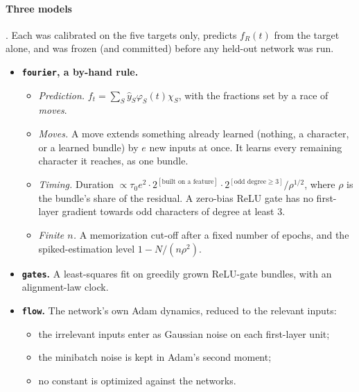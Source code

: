 \paragraph{Three models} . Each was calibrated on the five targets only, predicts $f_R(t)$ from the target alone, and was frozen (and committed) before any held-out network was run.
\begin{itemize}
\item \textbf{\texttt{fourier}, a by-hand rule.}
  \begin{itemize}
  \item \emph{Prediction.} $f_t=\sum_S\hat y_S\varphi_S(t)\chi_S$, with the fractions set by a race of \emph{moves}.
  \item \emph{Moves.} A move extends something already learned (nothing, a character, or a learned bundle) by $e$ new inputs at once. It learns every remaining character it reaches, as one bundle.
  \item \emph{Timing.} Duration $\propto\tau_0e^2\cdot2^{[\text{built on a feature}]}\cdot2^{[\text{odd degree}\ge3]}/\rho^{1/2}$, where $\rho$ is the bundle's share of the residual. A zero-bias ReLU gate has no first-layer gradient towards odd characters of degree at least 3.
  \item \emph{Finite $n$.} A memorization cut-off after a fixed number of epochs, and the spiked-estimation level $1-N/(n\rho^2)$.
  \end{itemize}
\item \textbf{\texttt{gates}.} A least-squares fit on greedily grown ReLU-gate bundles, with an alignment-law clock.
\item \textbf{\texttt{flow}.} The network's own Adam dynamics, reduced to the relevant inputs:
  \begin{itemize}
  \item the irrelevant inputs enter as Gaussian noise on each first-layer unit;
  \item the minibatch noise is kept in Adam's second moment;
  \item no constant is optimized against the networks.
  \end{itemize}
\end{itemize}

